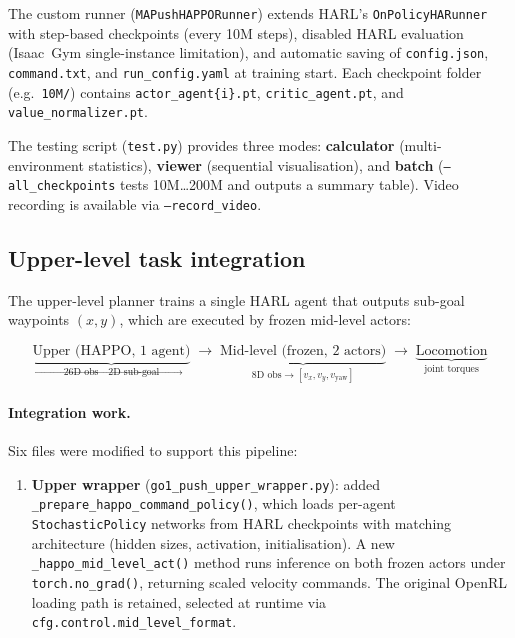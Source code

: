 \begin{dirtree}
The custom runner (\texttt{MAPushHAPPORunner}) extends HARL's
\texttt{OnPolicyHARunner} with step-based checkpoints (every 10M steps),
disabled HARL evaluation (Isaac~Gym single-instance limitation), and
automatic saving of \texttt{config.json}, \texttt{command.txt}, and
\texttt{run\_config.yaml} at training start. Each checkpoint folder
(e.g.\ \texttt{10M/}) contains \texttt{actor\_agent\{i\}.pt},
\texttt{critic\_agent.pt}, and \texttt{value\_normalizer.pt}.

The testing script (\texttt{test.py}) provides three modes:
\textbf{calculator} (multi-environment statistics),
\textbf{viewer} (sequential visualisation), and
\textbf{batch} (\texttt{--all\_checkpoints} tests 10M\ldots200M and
outputs a summary table).
Video recording is available via \texttt{--record\_video}.

\subsection{Upper-level task integration}

The upper-level planner trains a single HARL agent that outputs sub-goal
waypoints $(x, y)$, which are executed by frozen mid-level actors:

\begin{equation*}
  \underbrace{\text{Upper (HAPPO, 1 agent)}}_{\text{26D obs} \to \text{2D sub-goal}}
  \;\to\;
  \underbrace{\text{Mid-level (frozen, 2 actors)}}_{\text{8D obs} \to [v_x, v_y, v_\text{yaw}]}
  \;\to\;
  \underbrace{\text{Locomotion}}_{\text{joint torques}}
\end{equation*}

\paragraph{Integration work.}
Six files were modified to support this pipeline:

\begin{enumerate}
  \item \textbf{Upper wrapper} (\texttt{go1\_push\_upper\_wrapper.py}): added
        \texttt{\_prepare\_happo\_command\_policy()}, which loads per-agent
        \texttt{StochasticPolicy} networks from HARL checkpoints with matching
        architecture (hidden sizes, activation, initialisation). A new
        \texttt{\_happo\_mid\_level\_act()} method runs inference on both
        frozen actors under \texttt{torch.no\_grad()}, returning scaled
        velocity commands. The original OpenRL loading path is retained,
        selected at runtime via \texttt{cfg.control.mid\_level\_format}.


\end{enumerate}
\end{dirtree}
